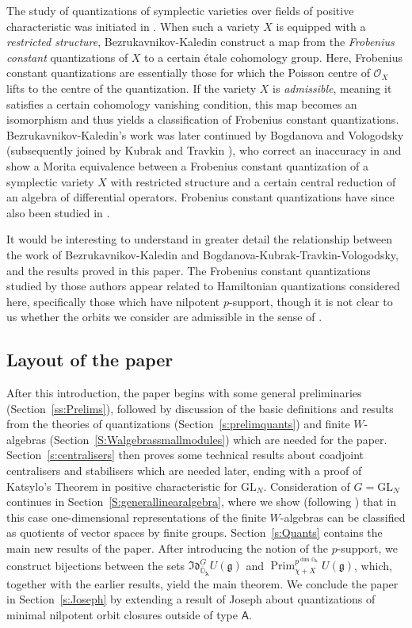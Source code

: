 \documentclass[twoside,12pt,reqno]{amsart}
\theoremstyle{remark}
\numberwithin{equation}{section}
\def\Prim{\operatorname{Prim}}
\def\blambda{{\bm{\lambda}}}
\def\o{\overline}
\def\O{{\mathbb O}}
\def\sA{{\mathsf{A}}}
\def\GL{\mathrm{GL}}
\def\g{{\mathfrak g}}
\def\Idl{\mathfrak{Id}}
\def\Oc{\mathcal{O}}
\begin{document}
The study of quantizations of symplectic varieties over fields of positive characteristic was initiated in \cite{BeKa}. When such a variety $X$ is equipped with a {\em restricted structure}, Bezrukavnikov-Kaledin construct a map from the {\em Frobenius constant} quantizations of $X$ to a certain \'{e}tale cohomology group. Here, Frobenius constant quantizations are essentially those for which the Poisson centre of $\Oc_X$ lifts to the centre of the quantization. If the variety $X$ is {\em admissible}, meaning it satisfies a certain cohomology vanishing condition, this map becomes an isomorphism and thus yields a classification of Frobenius constant quantizations. Bezrukavnikov-Kaledin's work was later continued by Bogdanova and Vologodsky \cite{BV} (subsequently joined by Kubrak and Travkin \cite{BKTV}), who correct an inaccuracy in \cite{BeKa} and show a Morita equivalence between a Frobenius constant quantization of a symplectic variety $X$ with restricted structure and a certain central reduction of an algebra of differential operators. Frobenius constant quantizations have since also been studied in \cite{Mu}.

It would be interesting to understand in greater detail the relationship between the work of Bezrukavnikov-Kaledin and Bogdanova-Kubrak-Travkin-Vologodsky, and the results proved in this paper. The Frobenius constant quantizations studied by those authors appear related to Hamiltonian quantizations considered here, specifically those which have nilpotent $p$-support, though it is not clear to us whether the orbits we consider are admissible in the sense of \cite{BeKa}.


\subsection{Layout of the paper}

After this introduction, the paper begins with some general preliminaries (Section~\ref{ss:Prelims}),  followed by discussion of the basic definitions and results from the theories of quantizations (Section~\ref{s:prelimquants}) and finite $W$-algebras (Section~\ref{S:Walgebrassmallmodules}) which are needed for the paper. Section~\ref{s:centralisers} then proves some technical results about coadjoint centralisers and stabilisers which are needed later, ending with a proof of Katsylo's Theorem in positive characteristic for $\GL_N$. Consideration of $G=\GL_N$ continues in Section~\ref{S:generallinearalgebra}, where we show (following \cite{GT}) that in this case one-dimensional representations of the finite $W$-algebras can be classified as quotients of vector spaces by finite groups. Section~\ref{s:Quants} contains the main new results of the paper. After introducing the notion of the $p$-support, we construct bijections between the sets $\Idl_{\o\O_\blambda}^G U(\g)$ and $\Prim_{\chi+X}^{p^{\dim \O_\blambda}}U(\g)$, which, together with the earlier results, yield the main theorem. We conclude the paper in Section~\ref{s:Joseph} by extending a result of Joseph about quantizations of minimal nilpotent orbit closures outside of type $\sA$.
\end{document}
